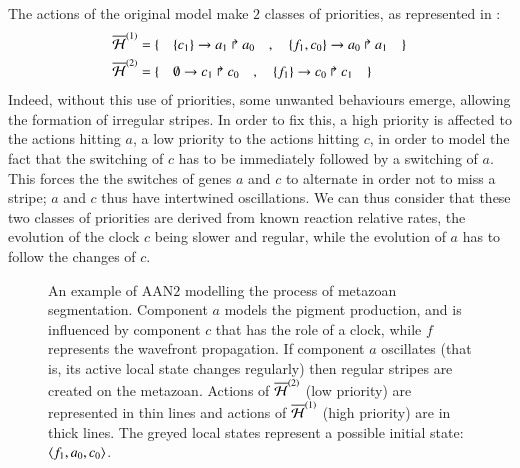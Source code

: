 The actions of the original model make $2$ classes of priorities, as represented in :
\begin{align*}
  \overline{\mathcal{H}}^{(1)} = \{ \quad
    & \{c_1\}\rightarrow a_1\Rsh a_0 \quad , \quad
    \{f_1, c_0\}\rightarrow a_0\Rsh a_1
  \quad \} \\
  \overline{\mathcal{H}}^{(2)} = \{ \quad
    & \emptyset\rightarrow c_1\Rsh c_0 \quad , \quad
    \{f_1\}\rightarrow c_0\Rsh c_1
  \quad \} \\
\end{align*}
Indeed, without this use of priorities,
some unwanted behaviours emerge, allowing the formation of irregular stripes.
In order to fix this, a high priority is affected to the actions hitting $a$,
a low priority to the actions hitting $c$,
in order to model the fact that the switching of $c$ has to be immediately followed by
a switching of $a$.
This forces the the switches of genes $a$ and $c$
to alternate in order not to miss a stripe;
$a$ and $c$ thus have intertwined oscillations.
We can thus consider that these two classes of priorities
are derived from known reaction relative rates,
the evolution of the clock $c$ being slower and regular,
while the evolution of $a$ has to follow the changes of $c$.

\begin{figure}[p]
  \centering
  \caption{
  \label{fig:metazoan-php}
    An example of AAN$2$
    modelling the process of metazoan segmentation.
    Component $a$ models the pigment production, and is influenced by
    component $c$ that has the role of a clock,
    while $f$ represents the wavefront propagation.
    If component $a$ oscillates (that is, its active local state changes regularly)
    then regular stripes are created on the metazoan.
    Actions of $\overline{\mathcal{H}}^{(2)}$ (low priority) are represented in thin lines
    and actions of $\overline{\mathcal{H}}^{(1)}$ (high priority) are in thick lines.
    The greyed local states represent a possible initial state:
    $\mbox{$\langle f_1, a_0, c_0 \rangle$}$.
  }
\end{figure}

